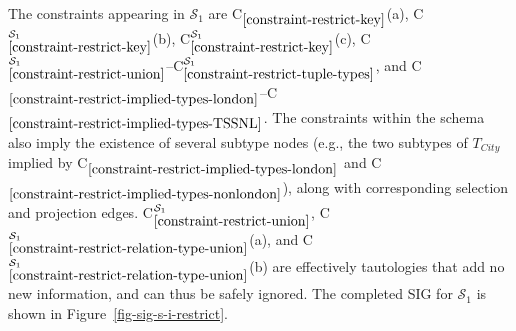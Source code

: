 \documentclass{article}
\newcounter{constraint}
\newcommand{\Type}[1]{\ensuremath{T_{#1}}}
\newcommand{\schema}[1]{\ensuremath{\mathcal{S}_{#1}}}
\newcommand{\Constraint}[2][]{C\ensuremath{_{#2}\ifx&#1&\else^{#1}\fi}}
\begin{document}
\noindent The constraints appearing in \(\schema{1}\) are \Constraint{\ref{constraint-restrict-key}}(a), \Constraint[\schema{1}]{\ref{constraint-restrict-key}}(b), \Constraint[\schema{1}]{\ref{constraint-restrict-key}}(c), \Constraint[\schema{1}]{\ref{constraint-restrict-union}}--\Constraint[\schema{1}]{\ref{constraint-restrict-tuple-types}}, and \Constraint{\ref{constraint-restrict-implied-types-london}}--\Constraint{\ref{constraint-restrict-implied-types-TSSNL}}. The constraints within the schema also imply the existence of several subtype nodes (e.g., the two subtypes of \(\Type{City}\) implied by \Constraint{\ref{constraint-restrict-implied-types-london}} and \Constraint{\ref{constraint-restrict-implied-types-nonlondon}}), along with corresponding selection and projection edges. \Constraint[\schema{1}]{\ref{constraint-restrict-union}}, \Constraint[\schema{1}]{\ref{constraint-restrict-relation-type-union}}(a), and \Constraint[\schema{1}]{\ref{constraint-restrict-relation-type-union}}(b) are effectively tautologies that add no new information, and can thus be safely ignored. The completed SIG for \(\schema{1}\) is shown in Figure~\ref{fig-sig-s-i-restrict}.

\end{document}
